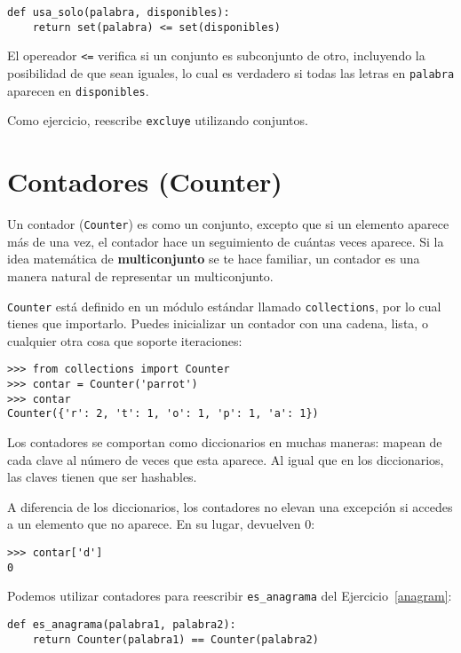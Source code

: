 \documentclass[10pt]{book}
\begin{document}
\begin{verbatim}
def usa_solo(palabra, disponibles):
    return set(palabra) <= set(disponibles)
\end{verbatim}
%
El opereador \verb"<=" verifica si un conjunto es subconjunto de otro,
incluyendo la posibilidad de que sean iguales, lo cual es verdadero si todas
las letras en {\tt palabra} aparecen en {\tt disponibles}.

Como ejercicio, reescribe \verb"excluye" utilizando conjuntos.


\section{Contadores (Counter)}

Un contador ({\tt Counter}) es como un conjunto, excepto que si un elemento aparece más
de una vez, el contador hace un seguimiento de cuántas veces aparece.
Si la idea matemática de {\bf multiconjunto} se te hace familiar,
un contador es una manera natural de representar un multiconjunto.

{\tt Counter} está definido en un módulo estándar llamado {\tt collections},
por lo cual tienes que importarlo.  Puedes inicializar un contador con una cadena,
lista, o cualquier otra cosa que soporte iteraciones:

\begin{verbatim}
>>> from collections import Counter
>>> contar = Counter('parrot')
>>> contar
Counter({'r': 2, 't': 1, 'o': 1, 'p': 1, 'a': 1})
\end{verbatim}

Los contadores se comportan como diccionarios en muchas maneras: mapean de cada
clave al número de veces que esta aparece.  Al igual que en los diccionarios,
las claves tienen que ser hashables.

A diferencia de los diccionarios, los contadores no elevan una excepción si accedes a
un elemento que no aparece.  En su lugar, devuelven 0:

\begin{verbatim}
>>> contar['d']
0
\end{verbatim}

Podemos utilizar contadores para reescribir \verb"es_anagrama" del
Ejercicio~\ref{anagram}:

\begin{verbatim}
def es_anagrama(palabra1, palabra2):
    return Counter(palabra1) == Counter(palabra2)
\end{verbatim}
\end{document}
